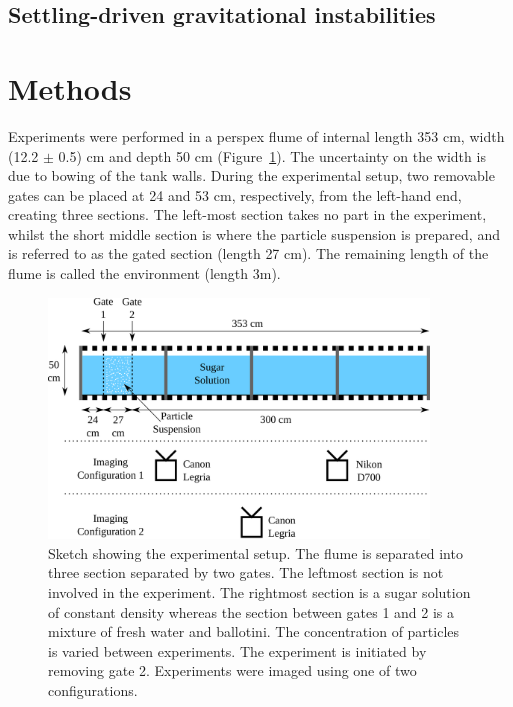 \documentclass[authoryear,preprint,review,12pt]{elsarticle}
\begin{document}
\subsection{Settling-driven gravitational instabilities}
\label{subsec:SDGI}

\section{Methods}
\label{sec:method}

Experiments were performed in a perspex flume of internal length 353 cm, width (12.2 $\pm$ 0.5) cm and depth 50 cm (Figure~\ref{fig:setup}). The uncertainty on the width is due to bowing of the tank walls. During the experimental setup, two removable gates can be placed at 24 and 53 cm, respectively, from the left-hand end, creating three sections. The left-most section takes no part in the experiment, whilst the short middle section is where the particle suspension is prepared, and is referred to as the gated section (length 27 cm). The remaining length of the flume is called the environment (length 3m).

\begin{figure}[ht!]
  \centerline{\includegraphics[width=0.9\textwidth]{setup.pdf}}
  \caption{Sketch showing the experimental setup. The flume is separated into three section separated by two gates. The leftmost section is not involved in the experiment. The rightmost section is a sugar solution of constant density whereas the section between gates 1 and 2 is a mixture of fresh water and ballotini. The concentration of particles is varied between experiments. The experiment is initiated by removing gate 2. Experiments were imaged using one of two configurations. }
  \label{fig:setup}
\end{figure}
\end{document}
